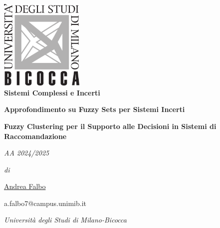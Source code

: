 \documentclass[12pt,a4paper,twoside,openany]{book}
\begin{document}
 

\begin{center}
\includegraphics[width=0.3\textwidth]{Immagini/logo_bicocca.png}\\

\vspace*{2\baselineskip}
{\huge \textbf{Sistemi Complessi e Incerti}}

\vspace*{1\baselineskip}
{\large \textbf{Approfondimento su Fuzzy Sets per Sistemi Incerti}}

\vspace*{3\baselineskip}
{\Large \textbf{Fuzzy Clustering per il Supporto alle Decisioni in Sistemi di Raccomandazione}}

\vspace*{8\baselineskip}
{\large \textbf{}}

\begin{large}
\vspace*{2\baselineskip}

\emph{AA 2024/2025}

\vspace*{2\baselineskip}

\emph{di} \\
{\Large \href{https://github.com/LilQuacky}{\faGithub{} Andrea Falbo} \par}
{{ a.falbo7@campus.unimib.it}}\\ [1cm]

\vspace*{1\baselineskip}
{\large{\emph{Università degli Studi di Milano-Bicocca}}\par}

\thispagestyle{empty}
\end{large}
\end{center}

\pagebreak



\tableofcontents 

\newpage 


\setcounter{chapter}{0} 








\appendix


\backmatter
\sloppy 
\printbibliography[heading=bibintoc, title=Bibliografia]

\newpage 
\end{document}
